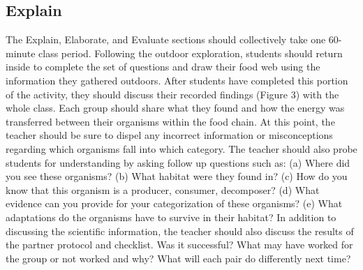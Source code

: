 \documentclass[11pt]{sig-alternate}
\begin{document}
\begin{large}
\subsection*{Explain}
The Explain, Elaborate, and Evaluate sections should collectively take one 60-minute class period. Following the outdoor exploration, students should return inside to complete the set of questions and draw their food web using the information they gathered outdoors. After students have completed this portion of the activity, they should discuss their recorded findings (Figure 3) with the whole class. Each group should share what they found and how the energy was transferred between their organisms within the food chain. At this point, the teacher should be sure to dispel any incorrect information or misconceptions regarding which organisms fall into which category. The teacher should also probe students for understanding by asking follow up questions such as: (a) Where did you see these organisms? (b) What habitat were they found in? (c) How do you know that this organism is a producer, consumer, decomposer? (d) What evidence can you provide for your categorization of these organisms? (e) What adaptations do the organisms have to survive in their habitat? In addition to discussing the scientific information, the teacher should also discuss the results of the partner protocol and checklist. Was it successful? What may have worked for the group or not worked and why? What will each pair do differently next time?


\end{large}
\end{document}
